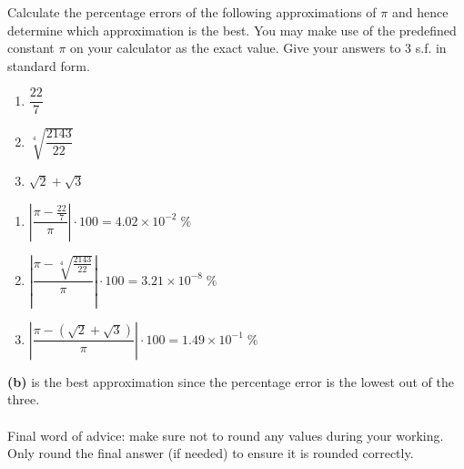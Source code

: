 \documentclass[12pt, a4paper, titlepage, twoside]{article}
\newcounter{excount}[subsection]
\begin{document}
	\begin{ex}
		Calculate the percentage errors of the following approximations of $\pi$ and hence determine which approximation 
		is the best. You may make use of the predefined constant $\pi$ on your calculator as the exact value. Give your answers to
		3 s.f. in standard form.
		
		\begin{multicols}{3}
			\begin{enumerate}[label=\textbf{(\alph*)}]
				\item $\dfrac{22}{7}$
				\item $\sqrt[4]{\dfrac{2143}{22}}$
				\item $\sqrt{2} + \sqrt{3}$
			\end{enumerate}
		\end{multicols}
		
		\tcbline
		\hfill
		
		\begin{enumerate}[label=\textbf{(\alph*)}]
			\item $\left\lvert \dfrac{\pi - \frac{22}{7}}{\pi} \right\rvert \cdot 100 = 4.02 \times 10^{-2} \; \%$
			\item $\left\lvert \dfrac{\pi - \sqrt[4]{\frac{2143}{22}}}{\pi}\right\rvert \cdot 100 = 3.21 \times 10^{-8} \; \%$
			\item $\left\lvert \dfrac{\pi - (\sqrt{2} + \sqrt{3})}{\pi}\right\rvert \cdot 100 = 1.49 \times 10^{-1} \; \%$
		\end{enumerate}
		\hfill
		
		\textbf{(b)} is the best approximation since the percentage error is the lowest out of the three.
	\end{ex}
	
	\paragraph{}
	Final word of advice: make sure not to round any values during your working. Only round the final answer (if needed) to ensure
	it is rounded correctly.\\
	
\end{document}

